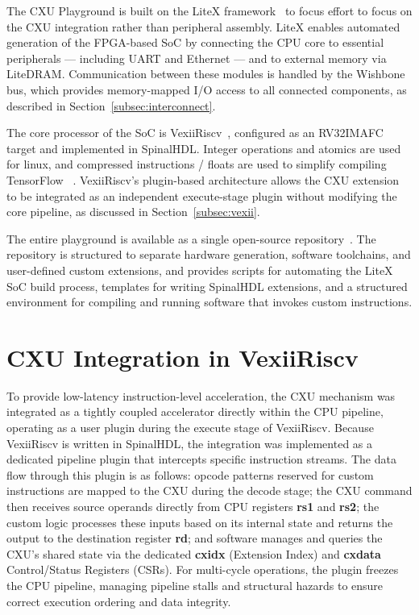 The CXU Playground is built on the LiteX framework~\cite{LiteXGitHub}
to focus effort to focus on the CXU integration rather than peripheral assembly.
LiteX enables automated generation of the FPGA-based SoC by connecting the CPU core
to essential peripherals --- including UART and Ethernet --- and to external memory via
LiteDRAM.
Communication between these modules is handled by the Wishbone bus, which provides
memory-mapped I/O access to all connected components, as described in
Section~\ref{subsec:interconnect}.

The core processor of the SoC is VexiiRiscv~\cite{VexiiRiscVGithub}, configured as an
RV32IMAFC target and implemented in SpinalHDL. Integer operations and atomics are used for linux,
and compressed instructions / floats are used to simplify compiling TensorFlow ~\cite{David2021TFLiteMicro}.
VexiiRiscv's plugin-based architecture allows the CXU extension to be integrated as an
independent execute-stage plugin without modifying the core pipeline, as discussed in
Section~\ref{subsec:vexii}.

The entire playground is available as a single open-source repository~\cite{CXUPlayground}.
The repository is structured to separate hardware generation, software toolchains, and
user-defined custom extensions, and provides scripts for automating the LiteX SoC build
process, templates for writing SpinalHDL extensions, and a structured environment for
compiling and running software that invokes custom instructions.

\section{CXU Integration in VexiiRiscv}
\label{sec:cxu_integration}

To provide low-latency instruction-level acceleration, the CXU mechanism was integrated
as a tightly coupled accelerator directly within the CPU pipeline, operating as a user
plugin during the execute stage of VexiiRiscv.
Because VexiiRiscv is written in SpinalHDL, the integration was implemented as a
dedicated pipeline plugin that intercepts specific instruction streams.
The data flow through this plugin is as follows: opcode patterns reserved for custom
instructions are mapped to the CXU during the decode stage; the CXU command then
receives source operands directly from CPU registers \textbf{rs1} and \textbf{rs2};
the custom logic processes these inputs based on its internal state and returns the
output to the destination register \textbf{rd}; and software manages and queries the
CXU's shared state via the dedicated \textbf{cxidx} (Extension Index) and
\textbf{cxdata} Control/Status Registers (CSRs).
For multi-cycle operations, the plugin freezes the CPU pipeline,
managing pipeline stalls and structural hazards to ensure correct execution ordering
and data integrity.

